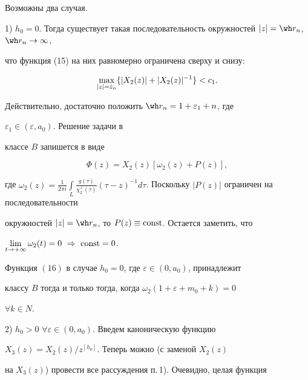 Возможны два случая. 


 


1) $h_0=0$. Тогда существует такая последовательность окружностей $|z|=\wh 


r_n$, $\wh r_n\to\infty$, 


что функция (15) на них равномерно ограничена сверху и снизу: 


$$ 


\max_{|z|=\Hat z_n}\{|X_2(z)|+|X_2(z)|^{-1}\}<c_1. 


$$ 


Действительно, достаточно положить $\wh r_n=1+\varepsilon_1+n$, где 


$\varepsilon_1\in(\varepsilon,a_0)$. Решение задачи в 


классе $B$ запишется в виде 


\begin{equation} 


\Phi(z)=X_2(z)[\omega_2(z)+P(z)], 


\end{equation} 


где $\omega_2(z)=\frac{1}{2\pi i}\int\limits_L \frac{g(\tau)}{\chi^+_2(\tau)} 


(\tau-z)^{-1}d\tau$. Поскольку $|P(z)|$ ограничен на последовательности 


окружностей $|z|=\wh r_n$, то $P(z)\equiv\operatorname{const}$. Остается заметить, что 


$\lim\limits_{t\to+\infty}\omega_2(t)=0\ \Rightarrow\ \const=0$. 


 


 


\begin{thm} 


Функция $(16)$ в случае $h_0=0$, где $\varepsilon\in(0,a_0)$, принадлежит 


классу $B$ тогда и только тогда, когда $\omega_2(1+\varepsilon+m_0+k)=0$ 


$\forall k\in N$. 


\end{thm} 


 


2) $h_0>0$ $\forall\varepsilon\in(0,a_0)$. Введем каноническую функцию 


$X_3(z)=X_2(z)/z^{[h_0]}$. Теперь можно (с заменой $X_2(z)$ 


на $X_3(z)$) провести все рассуждения п.\,1). Очевидно, целая функция 


